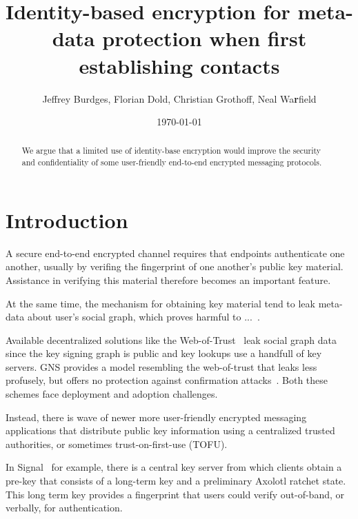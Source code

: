 \documentclass[twoside,letterpaper]{sig-alternate}
\title{Identity-based encryption for meta-data protection when first establishing contacts}
\author{Jeffrey Burdges, Florian Dold, Christian Grothoff, Neal Wa{\bf r}field}
\date{\today}
\begin{document}
\maketitle


\begin{abstract}
We argue that a limited use of identity-base encryption would improve
the security and confidentiality of some user-friendly end-to-end
encrypted messaging protocols.
\end{abstract}

\section{Introduction}


A secure end-to-end encrypted channel requires that endpoints
authenticate one another, usually by verifing the fingerprint of
one another's public key material.
Assistance in verifying this material therefore becomes an important
feature. %

At the same time, the mechanism for obtaining key material tend to
leak meta-data about user's social graph, which proves harmful to 
...~\cite{skynet,??metadatapolution??}.

Available decentralized solutions like the Web-of-Trust~\cite{wot}
leak social graph data since the key signing graph is public and
key lookups use a handfull of key servers.  GNS provides a model
resembling the web-of-trust that leaks less profusely, but offers
no protection against confirmation attacks~\cite{gns}.  
Both these schemes face deployment and adoption challenges.

Instead, there is wave of newer more user-friendly encrypted messaging
applications that distribute public key information using a centralized
trusted authorities, or sometimes trust-on-first-use (TOFU). 

In Signal~\cite{TextSecure} for example, there is a central key server
from which clients obtain a pre-key that consists of a long-term key
and a preliminary Axolotl ratchet state.  
This long term key provides a fingerprint that users could verify
out-of-band, or verbally, for authentication. 
\end{document}
